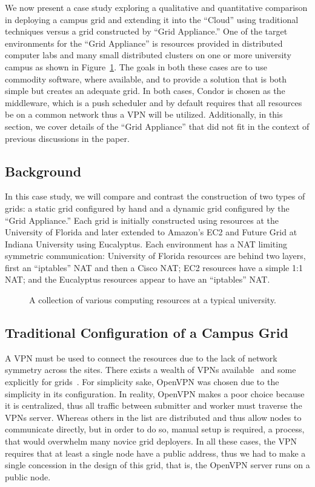 \documentclass[twocolumn]{svjour3}
\begin{document}
We now present a case study exploring a qualitative and quantitative comparison
in deploying a campus grid and extending it into the ``Cloud'' using
traditional techniques versus a grid constructed by ``Grid Appliance.''  One of
the target environments for the ``Grid Appliance'' is resources provided in
distributed computer labs and many small distributed clusters on one or more
university campus as shown in Figure~\ref{fig:unconnected}.  The goals in both
these cases are to use commodity software, where available, and to provide a
solution that is both simple but creates an adequate grid.  In both cases,
Condor is chosen as the middleware, which is a push scheduler and by default
requires that all resources be on a common network thus a VPN will be utilized.
Additionally, in this section, we cover details of the ``Grid Appliance'' that
did not fit in the context of previous discussions in the paper.

\subsection{Background}

In this case study, we will compare and contrast the construction of two types
of grids:  a static grid configured by hand and a dynamic grid configured by
the ``Grid Appliance.''  Each grid is initially constructed using resources at
the University of Florida and later extended to Amazon's EC2 and Future Grid at
Indiana University using Eucalyptus.  Each environment has a NAT limiting
symmetric communication: University of Florida resources are behind two layers,
first an ``iptables'' NAT and then a Cisco NAT; EC2 resources have a simple 1:1
NAT; and the Eucalyptus resources appear to have an ``iptables'' NAT.

\begin{figure}[ht]
\centering
{}
\caption{A collection of various computing resources at a typical university.}
\label{fig:unconnected}
\end{figure}

\subsection{Traditional Configuration of a Campus Grid}

A VPN must be used to connect the resources due to the lack of network symmetry
across the sites.  There exists a wealth of VPNs
available~\cite{hamachi,openvpn,tinc} and some explicitly for
grids~\cite{violin,vine,vnet}.  For simplicity sake, OpenVPN was chosen due to
the simplicity in its configuration.  In reality, OpenVPN makes a poor choice
because it is centralized, thus all traffic between submitter and worker must
traverse the VPNs server.  Whereas others in the list are distributed and thus
allow nodes to communicate directly, but in order to do so, manual setup is
required, a process, that would overwhelm many novice grid deployers.  In all
these cases, the VPN requires that at least a single node have a public
address, thus we had to make a single concession in the design of this grid,
that is, the OpenVPN server runs on a public node.
\end{document}

